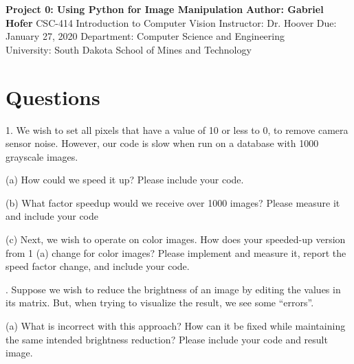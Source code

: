 \documentclass[12pt]{article}
\begin{document}
\begin{titlepage}
   \begin{center}
       \vspace*{1cm}
       \large
       \textbf{Project 0: Using Python for Image Manipulation}
       \normalsize
       \vspace{0.5cm}
       \textbf{Author: Gabriel Hofer}
       \vspace{0.5cm}
       CSC-414 Introduction to Computer Vision
       \vspace{0.5cm}
       Instructor: Dr. Hoover
       \vspace{0.5cm}
       Due: January 27, 2020
       \vfill
       Department: Computer Science and Engineering\\
       University: South Dakota School of Mines and Technology\\
   \end{center}
\end{titlepage}


\newpage
\section{Questions}
1. We wish to set all pixels that have a value of 10 or less to 0, to remove camera
sensor noise. However, our code is slow when run on a database with 1000
grayscale images.

(a) How could we speed it up? Please include your code.



(b) What factor speedup would we receive over 1000 images? Please measure it
and include your code

(c) Next, we wish to operate on color images. How does your speeded-up version
from 1 (a) change for color images? Please implement and measure it, report
the speed factor change, and include your code.

. Suppose we wish to reduce the brightness of an image by editing the values in its
matrix. But, when trying to visualize the result, we see some “errors”.

(a) What is incorrect with this approach? How can it be fixed while maintaining
the same intended brightness reduction? Please include your code and result
image.
\end{document}
